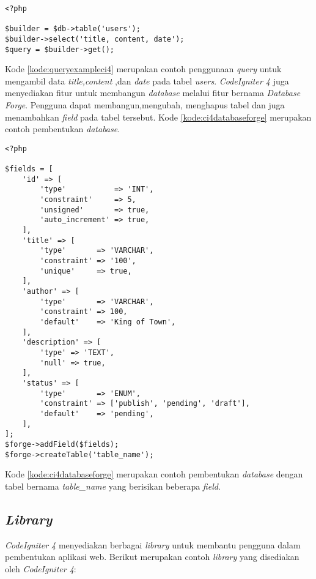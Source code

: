 \begin{lstlisting}[caption=Contoh penggunaan \textit{query} menggunakan konfigurasi pada \textit{CodeIgniter 4}. ,label=kode:queryexampleci4]
<?php

$builder = $db->table('users');
$builder->select('title, content, date');
$query = $builder->get();
\end{lstlisting}
Kode \ref{kode:queryexampleci4} merupakan contoh penggunaan \textit{query} untuk mengambil data \textit{title,content} ,dan \textit{date} pada tabel \textit{users}. \textit{CodeIgniter 4} juga menyediakan fitur untuk membangun \textit{database} melalui fitur bernama \textit{Database Forge}. Pengguna dapat membangun,mengubah, menghapus tabel dan juga menambahkan \textit{field} pada tabel tersebut. Kode \ref{kode:ci4databaseforge} merupakan contoh pembentukan \textit{database}.
\begin{lstlisting}[caption=Contoh pembentukan tabel melalui \textit{database forge}. ,label=kode:ci4databaseforge]
<?php

$fields = [
    'id' => [
        'type'           => 'INT',
        'constraint'     => 5,
        'unsigned'       => true,
        'auto_increment' => true,
    ],
    'title' => [
        'type'       => 'VARCHAR',
        'constraint' => '100',
        'unique'     => true,
    ],
    'author' => [
        'type'       => 'VARCHAR',
        'constraint' => 100,
        'default'    => 'King of Town',
    ],
    'description' => [
        'type' => 'TEXT',
        'null' => true,
    ],
    'status' => [
        'type'       => 'ENUM',
        'constraint' => ['publish', 'pending', 'draft'],
        'default'    => 'pending',
    ],
];
$forge->addField($fields);
$forge->createTable('table_name');
\end{lstlisting}
Kode \ref{kode:ci4databaseforge} merupakan contoh pembentukan \textit{database} dengan tabel bernama \textit{table\_name} yang berisikan beberapa \textit{field}. 

\subsection{\textit{Library}}
\textit{CodeIgniter 4} menyediakan berbagai \textit{library} untuk membantu pengguna dalam pembentukan aplikasi web. Berikut merupakan contoh \textit{library} yang disediakan oleh \textit{CodeIgniter 4}:
